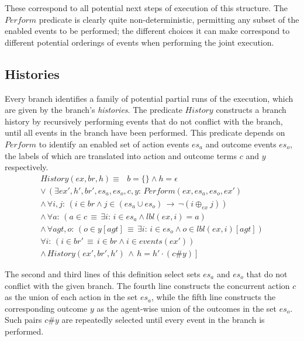 These correspond to all potential next steps of execution of this
structure. The $Perform$ predicate is clearly quite non-deterministic,
permitting any subset of the enabled events to be performed; the different
choices it can make correspond to different potential orderings of
events when performing the joint execution.


\subsection{Histories}

Every branch identifies a family of potential partial runs of the
execution, which are given by the branch's \emph{histories}. The predicate
$History$ constructs a branch history by recursively performing events
that do not conflict with the branch, until all events in the branch
have been performed. This predicate depends on $Perform$ to identify
an enabled set of action events $es_{a}$ and outcome events $es_{o}$,
the labels of which are translated into action and outcome terms $c$
and $y$ respectively. \begin{gather*}
History(ex,br,h)\equiv\,\,\,\, b=\{\}\wedge h=\epsilon\\
\vee\,\left(\exists ex',h',br',es_{a},es_{o},c,y:\, Perform(ex,es_{a},es_{o},ex')\right.\\
\wedge\,\forall i,j:\,\left(i\in br\wedge j\in(es_{a}\cup es_{o})\,\rightarrow\,\neg(i\oplus_{ex}j)\right)\\
\wedge\,\forall a:\,\left(a\in c\,\equiv\,\exists i:\, i\in es_{a}\wedge lbl(ex,i)=a\right)\\
\wedge\,\forall agt,o:\,\left(o\in y[agt]\,\equiv\,\exists i:\, i\in es_{o}\wedge o\in lbl(ex,i)[agt]\right)\\
\forall i:\,\left(i\in br'\,\equiv\, i\in br\wedge i\in events(ex')\right)\\
\left.\wedge\, History(ex',br',h')\,\wedge\, h=h'\cdot(c\#y)\right]\end{gather*}


The second and third lines of this definition select sets $es_{a}$
and $es_{o}$ that do not conflict with the given branch. The fourth
line constructs the concurrent action $c$ as the union of each action
in the set $es_{a}$, while the fifth line constructs the corresponding
outcome $y$ as the agent-wise union of the outcomes in the set $es_{o}$.
Such pairs $c\#y$ are repeatedly selected until every event in the
branch is performed.

